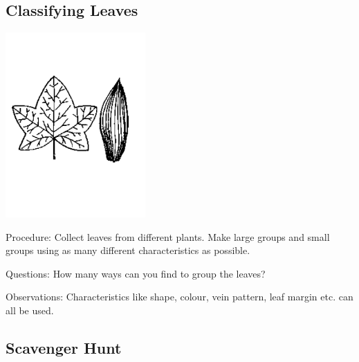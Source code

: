 \begin{multicols}{2}
\subsection{Classifying Leaves} %

\begin{center}
\includegraphics[width=0.4\textwidth]{./img/source/classify-leaves.png}
\end{center}

\begin{description*}
\item[Procedure:]{Collect leaves from different plants. Make large groups and small groups using as many
different characteristics as possible.}
\item[Questions:]{How many ways can you find to group the leaves?}
\item[Observations:]{Characteristics like shape, colour, vein pattern, leaf margin etc. can all be used.}
\end{description*}

\subsection{Scavenger Hunt} %



\end{multicols}
